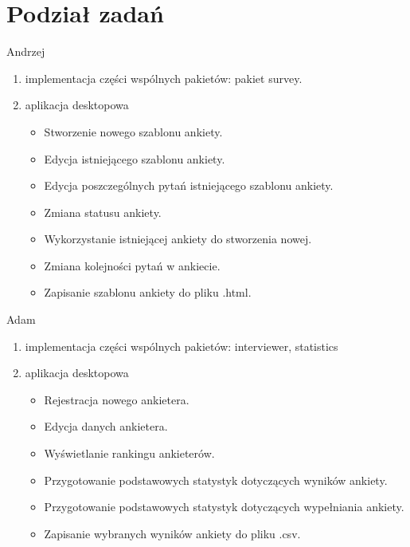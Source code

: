 \documentclass[a4paper,10pt]{beamer}
\begin{document}
	\section{Podział zadań}
	
	\begin{frame}{Andrzej}
		\begin{enumerate}
			\item	implementacja części wspólnych pakietów: pakiet survey.
			\item	aplikacja desktopowa
			\begin{itemize}
				\item  	Stworzenie nowego szablonu ankiety. 
				\item	Edycja istniejącego szablonu ankiety.
				\item	Edycja poszczególnych pytań istniejącego szablonu ankiety.
				\item	Zmiana statusu ankiety.
				\item	Wykorzystanie istniejącej ankiety do stworzenia nowej.
				\item	Zmiana kolejności pytań w ankiecie.
				\item	Zapisanie szablonu ankiety do pliku .html.
			\end{itemize}
		\end{enumerate}
	\end{frame}
	
	\begin{frame}{Adam}
		\begin{enumerate}
			\item	implementacja części wspólnych pakietów: interviewer, statistics
			\item	aplikacja desktopowa	
			\begin{itemize}
				\item Rejestracja nowego ankietera.
				\item	Edycja danych ankietera.
				\item	Wyświetlanie rankingu ankieterów.
				\item	Przygotowanie podstawowych statystyk dotyczących wyników ankiety.
				\item	Przygotowanie podstawowych statystyk dotyczących wypełniania ankiety.
				\item	Zapisanie wybranych wyników ankiety do pliku .csv.
			\end{itemize}
		\end{enumerate}
	\end{frame}
	
\end{document}
